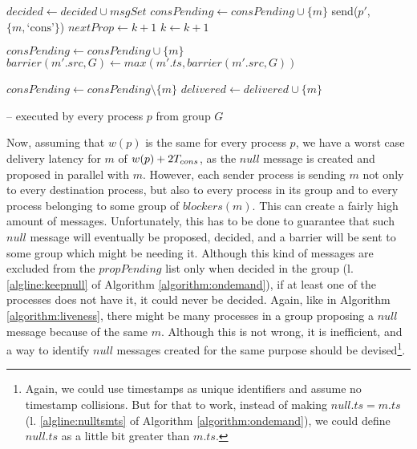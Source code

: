 \documentclass[times, 10pt]{article}
\begin{document}
\begin{algorithm}
\begin{distribalgo}[1]
\blankline
{}
  \STATE $decided \leftarrow decided \cup msgSet$
   \label{algline:checkcons}
    \STATE $consPending \leftarrow consPending \cup \{m\}$
  \ENDINDENT
      \STATE send($p'$, $\{m, \text{`cons'}\}$)
    \ENDINDENT
  \ENDINDENT
  \STATE $nextProp \leftarrow k + 1$
  \STATE $k \leftarrow k + 1$  
\ENDINDENT

\blankline
{}  
    \STATE $consPending \leftarrow consPending \cup \{m\}$
  \ENDIF
  \STATE $barrier(m'.src,G) \leftarrow max(m'.ts, barrier(m'.src,G))$  
\ENDINDENT

\blankline
{}
  \STATE $consPending \leftarrow consPending \setminus \{m\}$
  \STATE {}
  \STATE $delivered \leftarrow delivered \cup \{m\}$

\blankline
\ENDINDENT

\caption{ -- executed by every process $p$ from group $G$}
\label{algorithm:ondemand}
\end{distribalgo}
\end{algorithm}

Now, assuming that $w(p)$ is the same for every process $p$, we have a worst case delivery latency for $m$ of $w(p) + 2T_{cons}$, as the $null$ message is created and proposed in parallel with $m$. However, each sender process is sending $m$ not only to every destination process, but also to every process in its group and to every process belonging to some group of $blockers(m)$. This can create a fairly high amount of messages. Unfortunately, this has to be done to guarantee that such $null$ message will eventually be proposed, decided, and a barrier will be sent to some group which might be needing it. Although this kind of messages are excluded from the $propPending$ list only when decided in the group (l. \ref{algline:keepnull} of Algorithm \ref{algorithm:ondemand}), if at least one of the processes does not have it, it could never be decided. Again, like in Algorithm \ref{algorithm:liveness}, there might be many processes in a group proposing a $null$ message because of the same $m$. Although this is not wrong, it is inefficient, and a way to identify $null$ messages created for the same purpose should be devised\footnote{Again, we could use timestamps as unique identifiers and assume no timestamp collisions. But for that to work, instead of making $null.ts = m.ts$ (l. \ref{algline:nulltsmts} of Algorithm \ref{algorithm:ondemand}), we could define $null.ts$ as a little bit greater than $m.ts$.}.
\end{document}
